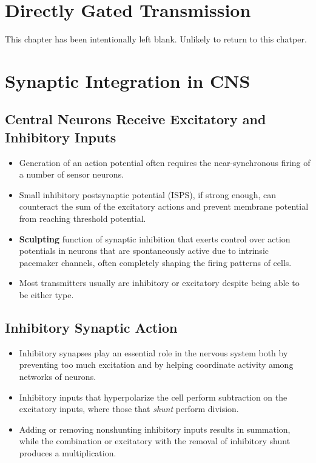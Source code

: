 \documentclass[12pt,a4paper]{article}
\begin{document}
\clearpage
\section{Directly Gated Transmission}   
\begin{center}
    This chapter has been intentionally left blank. Unlikely to return to this chatper.
\end{center}

\clearpage
\section{Synaptic Integration in CNS}
\subsection{Central Neurons Receive Excitatory and Inhibitory Inputs}
\begin{itemize}
    \item Generation of an action potential often requires the near-synchronous firing of a number of sensor neurons.
    \item Small inhibitory postsynaptic potential (ISPS), if strong enough, can counteract the sum of the excitatory actions and prevent membrane potential from reaching threshold potential.
    \item \textbf{Sculpting} function of synaptic inhibition that exerts control over action potentials in neurons that are spontaneously active due to intrinsic pacemaker channels, often completely shaping the firing patterns of cells.
    \item Most transmitters usually are inhibitory or excitatory despite being able to be either type. 
\end{itemize}

\subsection{Inhibitory Synaptic Action}
\begin{itemize}
    \item Inhibitory synapses play an essential role in the nervous system both by preventing too much excitation and by helping coordinate activity among networks of neurons. 
    \item Inhibitory inputs that hyperpolarize the cell perform subtraction on the excitatory inputs, where those that \textit{shunt} perform division. 
    \item Adding or removing nonshunting inhibitory inputs results in summation, while the combination or excitatory with the removal of inhibitory shunt produces a multiplication.
\end{itemize}
\end{document}
